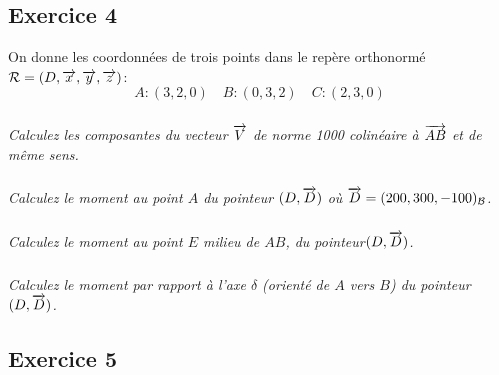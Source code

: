 \documentclass[11pt,oneside]{article}
\begin{document}



\subsection*{Exercice 4}
\setcounter{subparagraph}{0}

On donne les coordonnées de trois points dans le repère orthonormé $\mathcal{R}  = \left(D,\overrightarrow{x},\overrightarrow{y},\overrightarrow{z} \right)$:
$$A : (3, 2, 0) \quad B : (0, 3, 2) \quad C : (2, 3, 0)$$
\subparagraph{}
\textit{Calculez les composantes du vecteur $\overrightarrow{V}$ de norme 1000 colinéaire à $\overrightarrow{AB}$ et de même sens.}


\subparagraph{}
\textit{Calculez le moment au point $A$ du pointeur $(D,\overrightarrow{D})$ où  $\overrightarrow{D}=(200,300,-100)_{\mathcal{B}}$.}


\subparagraph{}
\textit{Calculez le moment au point $E$ milieu de $AB$, du pointeur$(D,\overrightarrow{D})$.}


\subparagraph{}
\textit{Calculez le moment par rapport à l'axe $\delta$ (orienté de $A$ vers $B$) du pointeur $(D,\overrightarrow{D})$. }




\subsection*{Exercice 5}
\setcounter{subparagraph}{0}
\end{document}
